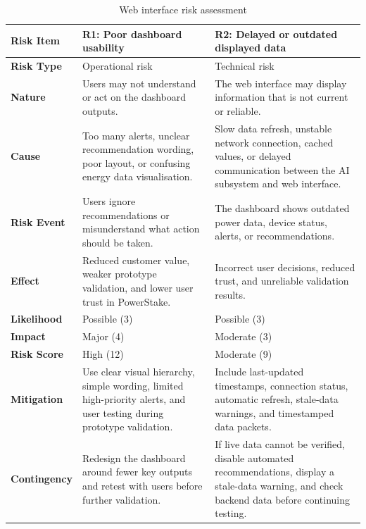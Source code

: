 \documentclass[11pt, twoside, a4paper]{article}
\begin{document}
\begin{table}[H]
    \centering
    \caption{Web interface risk assessment}
    \begin{tabular}{|p{3.5cm}|p{5.8cm}|p{5.8cm}|}
    \hline
    \textbf{Risk Item} & \textbf{R1: Poor dashboard usability} & \textbf{R2: Delayed or outdated displayed data} \\ \hline
    
    \textbf{Risk Type} & Operational risk & Technical risk \\ \hline
    
    \textbf{Nature} & Users may not understand or act on the dashboard outputs. & The web interface may display information that is not current or reliable. \\ \hline
    
    \textbf{Cause} & Too many alerts, unclear recommendation wording, poor layout, or confusing energy data visualisation. & Slow data refresh, unstable network connection, cached values, or delayed communication between the AI subsystem and web interface. \\ \hline
    
    \textbf{Risk Event} & Users ignore recommendations or misunderstand what action should be taken. & The dashboard shows outdated power data, device status, alerts, or recommendations. \\ \hline
    
    \textbf{Effect} & Reduced customer value, weaker prototype validation, and lower user trust in PowerStake. & Incorrect user decisions, reduced trust, and unreliable validation results. \\ \hline
    
    \textbf{Likelihood} & Possible (3) & Possible (3) \\ \hline
    
    \textbf{Impact} & Major (4) & Moderate (3) \\ \hline
    
    \textbf{Risk Score} & High (12) & Moderate (9) \\ \hline
    
    \textbf{Mitigation} & Use clear visual hierarchy, simple wording, limited high-priority alerts, and user testing during prototype validation. & Include last-updated timestamps, connection status, automatic refresh, stale-data warnings, and timestamped data packets. \\ \hline
    
    \textbf{Contingency} & Redesign the dashboard around fewer key outputs and retest with users before further validation. & If live data cannot be verified, disable automated recommendations, display a stale-data warning, and check backend data before continuing testing. \\ \hline
    
    \end{tabular}
    \end{table}
\end{document}

